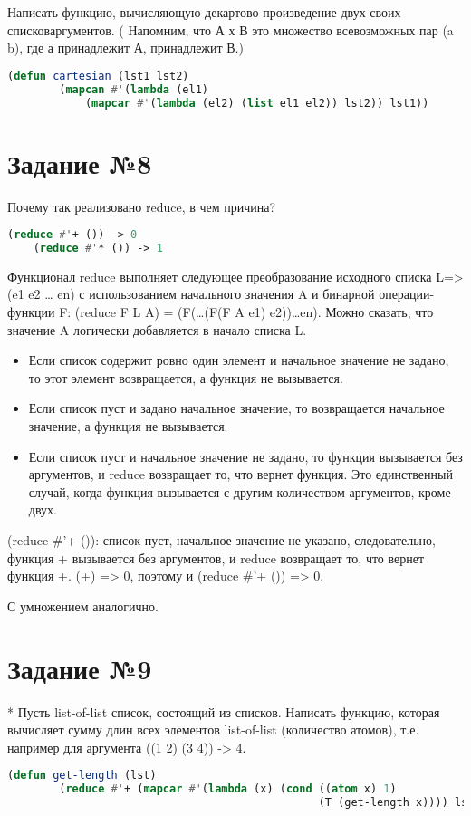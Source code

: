 Написать функцию, вычисляющую декартово произведение двух своих списковаргументов. ( Напомним, что А х В это множество всевозможных пар (a b), где а принадлежит А, принадлежит В.)

\begin{lstlisting}[language=Lisp]
	(defun cartesian (lst1 lst2)
		(mapcan #'(lambda (el1)
			(mapcar #'(lambda (el2) (list el1 el2)) lst2)) lst1))
\end{lstlisting}

\section{Задание №8}

Почему так реализовано reduce, в чем причина?
\begin{lstlisting}[language=Lisp]
	(reduce #'+ ()) -> 0
	(reduce #'* ()) -> 1
\end{lstlisting}

Функционал reduce выполняет следующее преобразование исходного списка L=>(e1 e2 … en) с использованием начального значения A и бинарной операции-функции F: (reduce F L A) = (F(…(F(F A e1) e2))…en). Можно сказать, что значение A логически добавляется в начало списка L.

\begin{itemize}
	\item Если список содержит ровно один элемент и начальное значение не задано, то этот элемент возвращается, а функция не вызывается. 
	\item Если список пуст и задано начальное значение, то возвращается начальное значение, а функция не вызывается. 
	\item Если список пуст и начальное значение не задано, то функция вызывается без аргументов, и reduce возвращает то, что вернет функция. Это единственный случай, когда функция вызывается с другим количеством аргументов, кроме двух.
\end{itemize}

(reduce \#'+ ()): список пуст, начальное значение не указано, следовательно, функция + вызывается без аргументов, и reduce возвращает то, что вернет функция +. (+) => 0, поэтому и (reduce \#'+ ()) => 0.

С умножением аналогично.

\section{Задание №9}

* Пусть list-of-list список, состоящий из списков. Написать функцию, которая
вычисляет сумму длин всех элементов list-of-list (количество атомов), т.е. например
для аргумента
((1 2) (3 4)) -> 4.

\begin{lstlisting}[language=Lisp]
	(defun get-length (lst)
		(reduce #'+ (mapcar #'(lambda (x) (cond ((atom x) 1)
												(T (get-length x)))) lst)))
\end{lstlisting}
